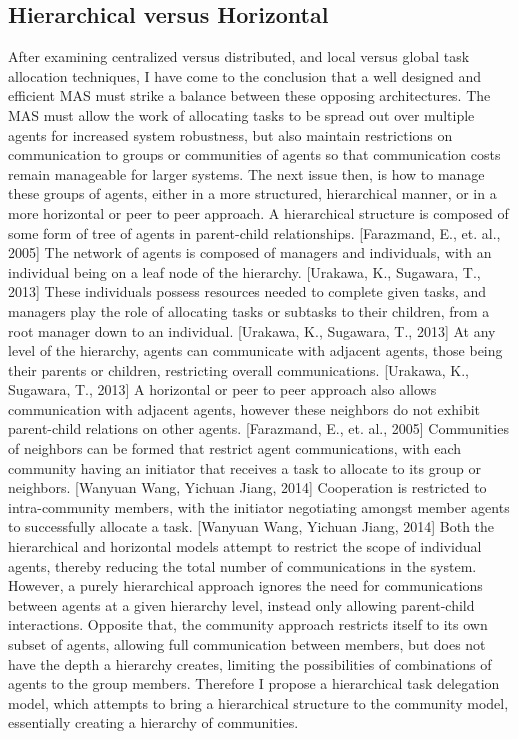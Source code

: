 \documentclass[12pt,letterpaper,onecolumn]{article}
\begin{document}
	\subsection{Hierarchical versus Horizontal}
	After examining centralized versus distributed, and local versus global task allocation techniques, I have come to the conclusion that a well designed and efficient MAS must strike a balance between these opposing architectures. The MAS must allow the work of allocating tasks to be spread out over multiple agents for increased system robustness, but also maintain restrictions on communication to groups or communities of agents so that communication costs remain manageable for larger systems. 
	The next issue then, is how to manage these groups of agents, either in a more structured, hierarchical manner, or in a more horizontal or peer to peer approach. A hierarchical structure is composed of some form of tree of agents in parent-child relationships. [Farazmand, E., et. al., 2005] The network of agents is composed of managers and individuals, with an individual being on a leaf node of the hierarchy. [Urakawa, K., Sugawara, T., 2013] These individuals possess resources needed to complete given tasks, and managers play the role of allocating tasks or subtasks to their children, from a root manager down to an individual. [Urakawa, K., Sugawara, T., 2013] At any level of the hierarchy, agents can communicate with adjacent agents, those being their parents or children, restricting overall communications. [Urakawa, K., Sugawara, T., 2013] A horizontal or peer to peer approach also allows communication with adjacent agents, however these neighbors do not exhibit parent-child relations on other agents. [Farazmand, E., et. al., 2005] Communities of neighbors can be formed that restrict agent communications, with each community having an initiator that receives a task to allocate to its group or neighbors. [Wanyuan Wang, Yichuan Jiang, 2014] Cooperation is restricted to intra-community members, with the initiator negotiating amongst member agents to successfully allocate a task. [Wanyuan Wang, Yichuan Jiang, 2014] Both the hierarchical and horizontal models attempt to restrict the scope of individual agents, thereby reducing the total number of communications in the system. However, a purely hierarchical approach ignores the need for communications between agents at a given hierarchy level, instead only allowing parent-child interactions. Opposite that, the community approach restricts itself to its own subset of agents, allowing full communication between members, but does not have the depth a hierarchy creates, limiting the possibilities of combinations of agents to the group members. Therefore I propose a hierarchical task delegation model, which attempts to bring a hierarchical structure to the community model, essentially creating a hierarchy of communities.
\end{document}
